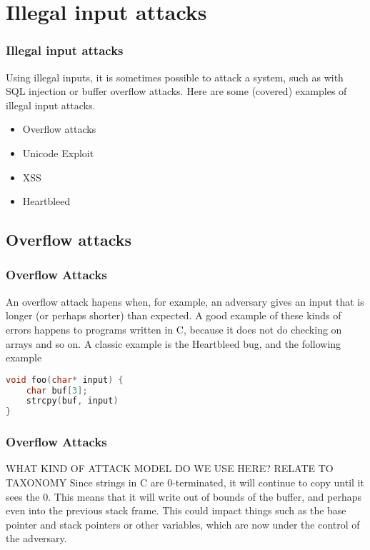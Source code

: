 \documentclass[14pt]{beamer}
\begin{document}
\section{Illegal input attacks}
    \begin{frame}
        \frametitle{Illegal input attacks} 
            Using illegal inputs, it is sometimes possible to attack a system, such as with SQL injection or buffer overflow attacks. Here are some (covered) examples of illegal input attacks. 
            \begin{itemize}
                \item Overflow attacks
                \item Unicode Exploit
                \item XSS
                \item Heartbleed
            \end{itemize}
    \end{frame}

\subsection{Overflow attacks}
\begin{frame}[fragile]
    \frametitle{Overflow Attacks}
        An overflow attack hapens when, for example, an adversary gives an input that is longer (or perhaps shorter) than expected. A good example of these kinds of errors happens to programs written in C, because it does not do checking on arrays and so on. A classic example is the Heartbleed bug, and the following example
        \begin{lstlisting}[language=C, frame=single]
void foo(char* input) {
    char buf[3];
    strcpy(buf, input)
}
        \end{lstlisting}

\end{frame}
    \begin{frame}
        \frametitle{Overflow Attacks}
                WHAT KIND OF ATTACK MODEL DO WE USE HERE? RELATE TO TAXONOMY
            Since strings in C are 0-terminated, it will continue to copy until it sees the 0. This means that it will write out of bounds of the buffer, and perhaps even into the previous stack frame. This could impact things such as the base pointer and stack pointers or other variables, which are now under the control of the adversary.
    \end{frame}
\end{document}
